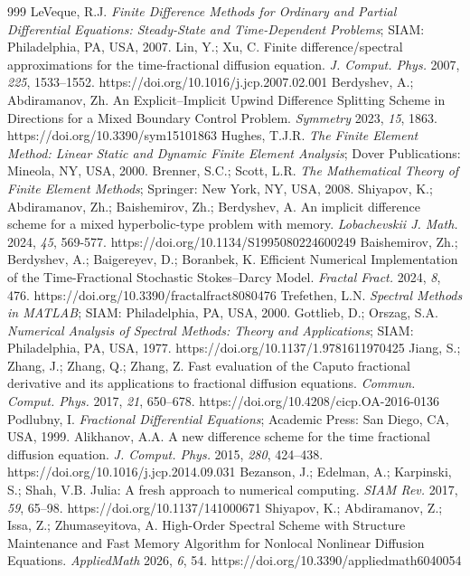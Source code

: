 \documentclass[a4paper,fleqn]{cas-sc}
\begin{document}
\begin{thebibliography}{999}
 LeVeque, R.J. \textit{Finite Difference Methods for Ordinary and Partial Differential Equations: Steady-State and Time-Dependent Problems}; SIAM: Philadelphia, PA, USA, 2007.
 Lin, Y.; Xu, C. Finite difference/spectral approximations for the time-fractional diffusion equation. \textit{J. Comput. Phys.} 2007, \textit{225}, 1533--1552. https://doi.org/10.1016/j.jcp.2007.02.001
 Berdyshev, A.; Abdiramanov, Zh. An Explicit--Implicit Upwind Difference Splitting Scheme in Directions for a Mixed Boundary Control Problem. \textit{Symmetry} 2023, \textit{15}, 1863. https://doi.org/10.3390/sym15101863
 Hughes, T.J.R. \textit{The Finite Element Method: Linear Static and Dynamic Finite Element Analysis}; Dover Publications: Mineola, NY, USA, 2000.
 Brenner, S.C.; Scott, L.R. \textit{The Mathematical Theory of Finite Element Methods}; Springer: New York, NY, USA, 2008.
 Shiyapov, K.; Abdiramanov, Zh.; Baishemirov, Zh.; Berdyshev, A. An implicit difference scheme for a mixed hyperbolic-type problem with memory. \textit{Lobachevskii J. Math.} 2024, \textit{45}, 569-577. https://doi.org/10.1134/S1995080224600249
 Baishemirov, Zh.; Berdyshev, A.; Baigereyev, D.; Boranbek, K. Efficient Numerical Implementation of the Time-Fractional Stochastic Stokes--Darcy Model. \textit{Fractal Fract.} 2024, \textit{8}, 476. https://doi.org/10.3390/fractalfract8080476
 Trefethen, L.N. \textit{Spectral Methods in MATLAB}; SIAM: Philadelphia, PA, USA, 2000.
 Gottlieb, D.; Orszag, S.A. \textit{Numerical Analysis of Spectral Methods: Theory and Applications}; SIAM: Philadelphia, PA, USA, 1977. https://doi.org/10.1137/1.9781611970425
 Jiang, S.; Zhang, J.; Zhang, Q.; Zhang, Z. Fast evaluation of the Caputo fractional derivative and its applications to fractional diffusion equations. \textit{Commun. Comput. Phys.} 2017, \textit{21}, 650--678. https://doi.org/10.4208/cicp.OA-2016-0136
 Podlubny, I. \textit{Fractional Differential Equations}; Academic Press: San Diego, CA, USA, 1999.
 Alikhanov, A.A. A new difference scheme for the time fractional diffusion equation. \textit{J. Comput. Phys.} 2015, \textit{280}, 424--438. https://doi.org/10.1016/j.jcp.2014.09.031
 Bezanson, J.; Edelman, A.; Karpinski, S.; Shah, V.B. Julia: A fresh approach to numerical computing. \textit{SIAM Rev.} 2017, \textit{59}, 65--98. https://doi.org/10.1137/141000671
 Shiyapov, K.; Abdiramanov, Z.; Issa, Z.; Zhumaseyitova, A. High-Order Spectral Scheme with Structure Maintenance and Fast Memory Algorithm for Nonlocal Nonlinear Diffusion Equations. \textit{AppliedMath} 2026, \textit{6}, 54. https://doi.org/10.3390/appliedmath6040054

\end{thebibliography}
\end{document}
